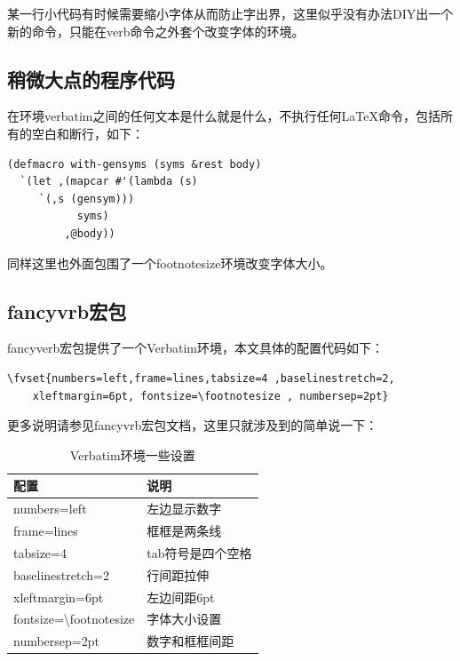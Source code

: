\documentclass[11pt,oneside]{book}
\begin{document}
\begin{common-format}
某一行小代码有时候需要缩小字体从而防止字出界，这里似乎没有办法DIY出一个新的命令，只能在verb命令之外套个改变字体的环境。



\subsection{稍微大点的程序代码}
在环境verbatim之间的任何文本是什么就是什么，不执行任何\LaTeX 命令，包括所有的空白和断行，如下：
\begin{footnotesize}
\begin{verbatim}
(defmacro with-gensyms (syms &rest body)
  `(let ,(mapcar #'(lambda (s)
     `(,s (gensym)))
           syms)
         ,@body))
\end{verbatim}
\end{footnotesize}
同样这里也外面包围了一个footnotesize环境改变字体大小。


\subsection{fancyvrb宏包}
fancyverb宏包提供了一个Verbatim环境，本文具体的配置代码如下：
\begin{Verbatim}
\fvset{numbers=left,frame=lines,tabsize=4 ,baselinestretch=2,
    xleftmargin=6pt, fontsize=\footnotesize , numbersep=2pt}
\end{Verbatim}

更多说明请参见fancyvrb宏包文档，这里只就涉及到的简单说一下：
\begin{table}[H]
\centering
\caption{Verbatim环境一些设置}
\label{tab:Verbatim环境一些设置}
\medskip 
\begin{tabular}{@{}ll@{}}
\toprule
配置                        & 说明     \\ \midrule
numbers=left                         & 左边显示数字     \\
frame=lines                          & 框框是两条线     \\
tabsize=4                            & tab符号是四个空格 \\
baselinestretch=2                    & 行间距拉伸      \\
xleftmargin=6pt                      & 左边间距6pt    \\
fontsize=\textbackslash footnotesize & 字体大小设置     \\  
numbersep=2pt                        & 数字和框框间距 \\   \bottomrule
\end{tabular}
\end{table}



\end{common-format}
\end{document}
